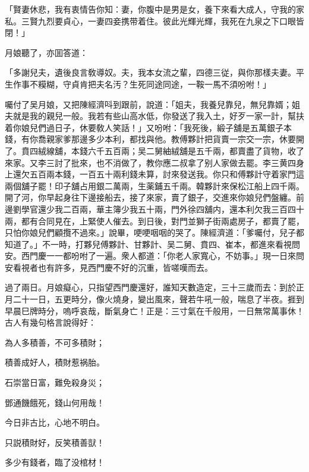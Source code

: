 「賢妻休悲，我有衷情告你知：妻，你腹中是男是女，養下來看大成人，守我的家私。三賢九烈要貞心，一妻四妾携带着住。彼此光輝光輝，我死在九泉之下口眼皆閉！」

月娘聽了，亦囬答道：

「多謝兒夫，遺後良言敎導奴。夫，我本女流之輩，四德三従，與你那樣夫妻。平生作事不糢糊，守貞肯把夫名汚？生死同途同途，一鞍一馬不須吩咐！」

囑付了吴月娘，又把陳經濟呌到跟前，說道：「姐夫，我養兒靠兒，無兒靠婿；姐夫就是我的親兒一般。我若有些山高水低，你發送了我入土，好歹一家一計，幫扶着你娘兒們過日子，休要敎人笑話！」又吩咐：「我死後，緞子舖是五萬銀子本錢，有你喬親家爹那邊多少本利，都找與他。教傅夥計把貨賣一宗交一宗，休要開了。賁四絨線舖，本錢六千五百兩；吴二舅紬絨舖是五千兩，都賣盡了貨物，收了來家。又李三討了批來，也不消做了，教你應二叔拿了别人家做去罷。李三黄四身上還欠五百兩本錢，一百五十兩利錢未算，討來發送我。你只和傅夥計守着家門這兩個舖子罷！印子舖占用銀二萬兩，生薬鋪五千兩。韓夥計來保松江船上四千兩。開了河，你早起身往下邊接船去，接了來家，賣了銀子，交進來你娘兒們盤纏。前邊劉學官還少我二百兩，華主簿少我五十兩，門外徐四舖内，還本利欠我三百四十兩，都有合同見在，上緊使人催去。到日後，對門並獅子街兩處房子，都賣了罷，只怕你娘兒們顧攬不過來。」說畢，哽哽咽咽的哭了。陳經濟道：「爹囑付，兒子都知道了。」不一時，打夥兒傅夥計、甘夥計、吴二舅、賁四、崔本，都進來看視問安。西門慶一一都吩咐了一遍。衆人都道：「你老人家寬心，不妨事。」現一日來問安看視者也有許多，見西門慶不好的沉重，皆嗟嘆而去。

過了兩日。月娘癡心，只指望西門慶還好，誰知天數造定，三十三歲而去：到於正月二十一日，五更時分，像火燒身，變出風來，聲若牛吼一般，喘息了半夜。捱到早晨巳牌時分，嗚呼哀哉，斷氣身亡！正是：三寸氣在千般用，一日無常萬事休！古人有幾句格言說得好：

為人多積善，不可多積財；

積善成好人，積財惹祸胎。

石崇當日富，難免殺身災；

鄧通饑餓死，錢山何用哉！

今日非古比，心地不明白。

只説積財好，反笑積善獃！

多少有錢者，臨了没棺材！

